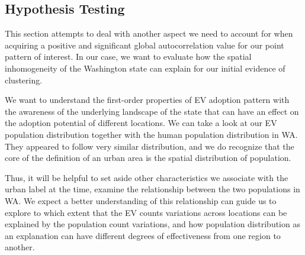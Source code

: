 \documentclass[
  letterpaper,
  DIV=11,
  numbers=noendperiod]{scrartcl}
\begin{document}
\subsection{Hypothesis Testing}\label{hypothesis-testing}

This section attempts to deal with another aspect we need to account for
when acquiring a positive and significant global autocorrelation value
for our point pattern of interest. In our case, we want to evaluate how
the spatial inhomogeneity of the Washington state can explain for our
initial evidence of clustering.

We want to understand the first-order properties of EV adoption pattern
with the awareness of the underlying landscape of the state that can
have an effect on the adoption potential of different locations. We can
take a look at our EV population distribution together with the human
population distribution in WA. They appeared to follow very similar
distribution, and we do recognize that the core of the definition of an
urban area is the spatial distribution of population.

Thus, it will be helpful to set aside other characteristics we associate
with the urban label at the time, examine the relationship between the
two populations in WA. We expect a better understanding of this
relationship can guide us to explore to which extent that the EV counts
variations across locations can be explained by the population count
variations, and how population distribution as an explanation can have
different degrees of effectiveness from one region to another.
\end{document}
